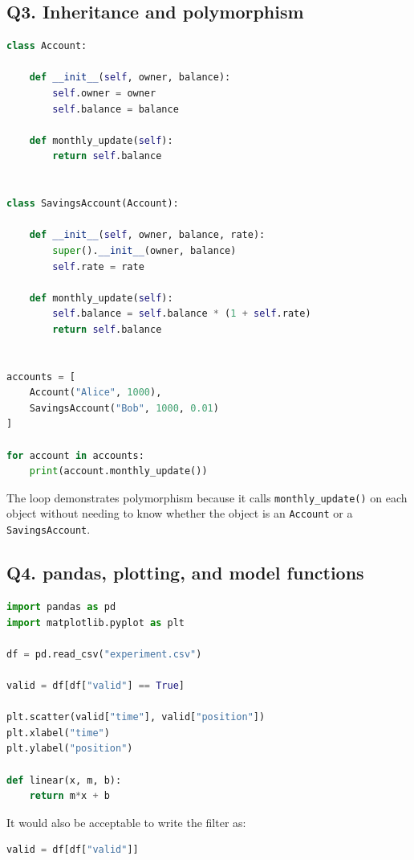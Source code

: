 \documentclass[12pt]{article}
\begin{document}
\subsection*{Q3. Inheritance and polymorphism}

\begin{lstlisting}[language=Python]
class Account:

    def __init__(self, owner, balance):
        self.owner = owner
        self.balance = balance

    def monthly_update(self):
        return self.balance


class SavingsAccount(Account):

    def __init__(self, owner, balance, rate):
        super().__init__(owner, balance)
        self.rate = rate

    def monthly_update(self):
        self.balance = self.balance * (1 + self.rate)
        return self.balance


accounts = [
    Account("Alice", 1000),
    SavingsAccount("Bob", 1000, 0.01)
]

for account in accounts:
    print(account.monthly_update())
\end{lstlisting}

The loop demonstrates polymorphism because it calls \texttt{monthly\_update()} on each object without needing to know whether the object is an \texttt{Account} or a \texttt{SavingsAccount}.

\subsection*{Q4. pandas, plotting, and model functions}

\begin{lstlisting}[language=Python]
import pandas as pd
import matplotlib.pyplot as plt

df = pd.read_csv("experiment.csv")

valid = df[df["valid"] == True]

plt.scatter(valid["time"], valid["position"])
plt.xlabel("time")
plt.ylabel("position")

def linear(x, m, b):
    return m*x + b
\end{lstlisting}

It would also be acceptable to write the filter as:

\begin{lstlisting}[language=Python]
valid = df[df["valid"]]
\end{lstlisting}
\end{document}

